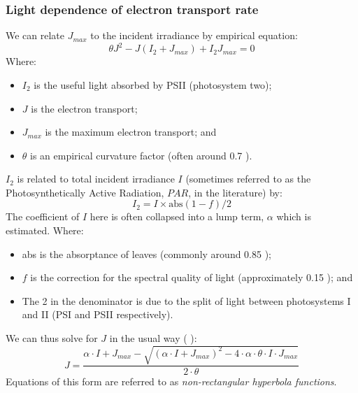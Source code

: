 \documentclass[11pt]{article} %
\begin{document}
\subsubsection{Light dependence of electron transport rate}
We can relate $J_{max}$ to the incident irradiance by empirical equation:
\begin{equation} \label{J_J_max_relationship}
 \theta J^2 - J\left (I_2 + J_{max}\right ) + I_2J_{max} = 0
\end{equation}
Where:
\begin{itemize}
 \item $I_2$ is the useful light absorbed by PSII (photosystem two);
 \item $J$ is the electron transport;
 \item $J_{max}$ is the maximum electron transport; and
 \item $\theta$ is an empirical curvature factor (often around 0.7 \cite{EvansPhotosynthesisnitrogenrelationships1989}).
\end{itemize}
$I_2$ is related to total incident irradiance $I$ (sometimes referred to as the Photosynthetically Active Radiation, $PAR$, in the literature) by:
\begin{equation} \label{I_2_def}
I_2 = I \times \textrm{abs}(1-f)/2
\end{equation}
The coefficient of $I$ here is often collapsed into a lump term, $\alpha$ which is estimated. 
Where:
\begin{itemize}
 \item abs is the absorptance of leaves (commonly around 0.85 \cite{CaemmererBiochemicalmodelsleaf2000});
 \item $f$ is the correction for the spectral quality of light (approximately 0.15 \cite{EvansDependenceQuantumYield1987}); and
 \item The 2 in the denominator is due to the split of light between photosystems I and II (PSI and PSII respectively).
\end{itemize}
We can thus solve for $J$ in the usual way (\cite{QianEstimationphotosynthesisparameters2012} \cite{YinC3C4photosynthesis2009}):
\begin{equation} \label{nonrectangular_hyperbola}
J = \frac{\alpha \cdot I + J_{max} - \sqrt{\left (\alpha \cdot I + J_{max}\right )^2 - 4 \cdot \alpha \cdot \theta \cdot I \cdot J_{max}}}{2  \cdot\theta}
\end{equation}
Equations of this form are referred to as \emph{non-rectangular hyperbola functions}.
\end{document}
